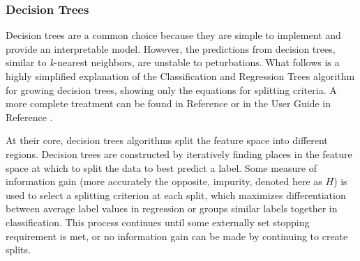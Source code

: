 \subsubsection{Decision Trees}

Decision trees are a common choice because they are simple to implement and
provide an interpretable model. However, the predictions from decision trees,
similar to \textit{k}-nearest neighbors, are unstable to peturbations.  What
follows is a highly simplified explanation of the Classification and Regression
Trees algorithm for growing decision trees, showing only the equations for
splitting criteria.  A more complete treatment can be found in Reference
\cite{elements_stats} or in the User Guide in Reference \cite{scikit}.

At their core, decision trees algorithms split the feature space into different
regions.  Decision trees are constructed by iteratively finding places in the
feature space at which to split the data to best predict a label. Some measure
of information gain (more accurately the opposite, impurity, denoted here as
$H$) is used to select a splitting criterion at each split, which maximizes
differentiation between average label values in regression or groups similar
labels together in classification.  This process continues until some
externally set stopping requirement is met, or no information gain can be made
by continuing to create splits. 

